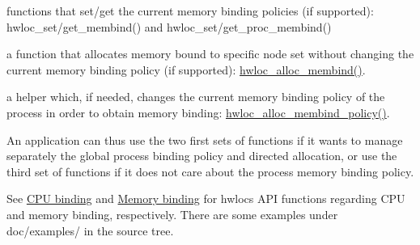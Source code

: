 \begin{DoxyItemize}
\item functions that set/get the current memory binding policies (if supported)\+: hwloc\+\_\+set/get\+\_\+membind() and hwloc\+\_\+set/get\+\_\+proc\+\_\+membind() 
\item a function that allocates memory bound to specific node set without changing the current memory binding policy (if supported)\+: \hyperlink{a00191_ga04736461780fadcf193af218c0122273}{hwloc\+\_\+alloc\+\_\+membind()}. 
\item a helper which, if needed, changes the current memory binding policy of the process in order to obtain memory binding\+: \hyperlink{a00191_gab1b77b8408bacaf03c7e8878f7577922}{hwloc\+\_\+alloc\+\_\+membind\+\_\+policy()}. 
\end{DoxyItemize}

An application can thus use the two first sets of functions if it wants to manage separately the global process binding policy and directed allocation, or use the third set of functions if it does not care about the process memory binding policy.

See \hyperlink{a00190}{C\+PU binding} and \hyperlink{a00191}{Memory binding} for hwloc\textquotesingle{}s A\+PI functions regarding C\+PU and memory binding, respectively. There are some examples under doc/examples/ in the source tree. 